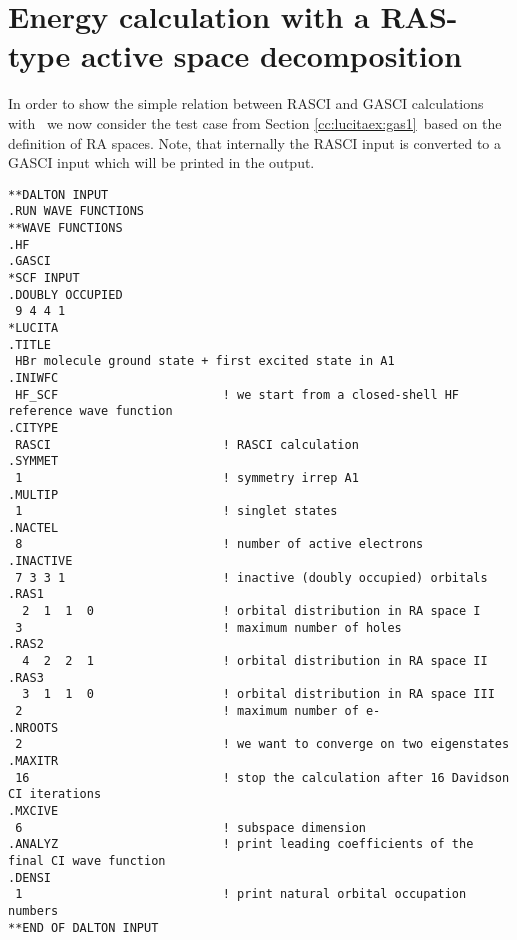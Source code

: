 \section{Energy calculation with a RAS-type active space decomposition}\label{cc:lucitaex:ras}
%
In order to show the simple relation between RASCI and GASCI calculations with \lucita\
we now consider the test case from Section \ref{cc:lucitaex:gas1}\ 
based on the definition of RA spaces. Note, that internally the RASCI input is converted to a GASCI 
input which will be printed in the output.

%
\begin{verbatim}
**DALTON INPUT
.RUN WAVE FUNCTIONS
**WAVE FUNCTIONS
.HF
.GASCI
*SCF INPUT
.DOUBLY OCCUPIED
 9 4 4 1
*LUCITA
.TITLE
 HBr molecule ground state + first excited state in A1
.INIWFC
 HF_SCF                       ! we start from a closed-shell HF reference wave function
.CITYPE
 RASCI                        ! RASCI calculation
.SYMMET
 1                            ! symmetry irrep A1
.MULTIP
 1                            ! singlet states
.NACTEL
 8                            ! number of active electrons
.INACTIVE
 7 3 3 1                      ! inactive (doubly occupied) orbitals
.RAS1
  2  1  1  0                  ! orbital distribution in RA space I
 3                            ! maximum number of holes
.RAS2
  4  2  2  1                  ! orbital distribution in RA space II
.RAS3
  3  1  1  0                  ! orbital distribution in RA space III
 2                            ! maximum number of e-
.NROOTS
 2                            ! we want to converge on two eigenstates
.MAXITR
 16                           ! stop the calculation after 16 Davidson CI iterations
.MXCIVE
 6                            ! subspace dimension
.ANALYZ                       ! print leading coefficients of the final CI wave function
.DENSI
 1                            ! print natural orbital occupation numbers
**END OF DALTON INPUT
\end{verbatim}

